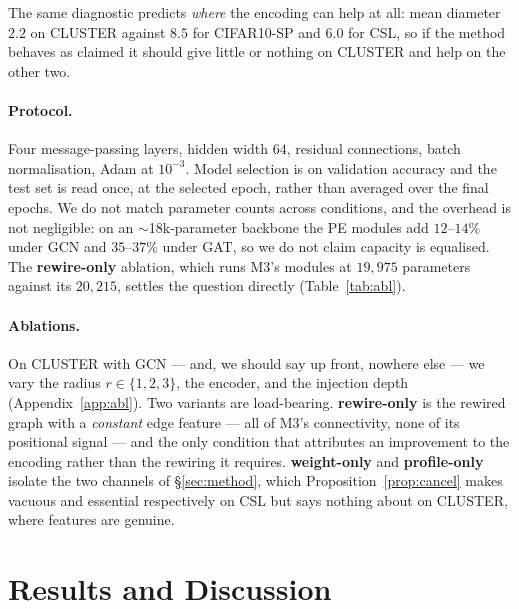 \documentclass[11pt]{article}
\begin{document}
The same diagnostic predicts \emph{where} the encoding can help at all: mean diameter $2.2$ on
CLUSTER against $8.5$ for CIFAR10-SP and $6.0$ for CSL, so if the method behaves as claimed it
should give little or nothing on CLUSTER and help on the other two.

\paragraph{Protocol.}
Four message-passing layers, hidden width $64$, residual connections, batch normalisation, Adam
at $10^{-3}$. Model selection is on validation accuracy and the test set is read once, at the
selected epoch, rather than averaged over the final epochs. We do not match parameter counts across conditions, and the overhead is
not negligible: on an $\sim$18k-parameter backbone the PE modules add $12$--$14\%$ under GCN and
$35$--$37\%$ under GAT, so we do not claim capacity is equalised. The \textbf{rewire-only}
ablation, which runs M3's modules at $19{,}975$ parameters against its $20{,}215$, settles the
question directly (Table~\ref{tab:abl}).

\paragraph{Ablations.}
On CLUSTER with GCN --- and, we should say up front, nowhere else --- we vary the radius
$r\in\{1,2,3\}$, the encoder, and the injection depth (Appendix~\ref{app:abl}). Two variants are
load-bearing. \textbf{rewire-only} is the rewired graph with a \emph{constant} edge feature ---
all of M3's connectivity, none of its positional signal --- and the only condition that attributes
an improvement to the encoding rather than the rewiring it requires.
\textbf{weight-only} and \textbf{profile-only} isolate the two channels of \S\ref{sec:method},
which Proposition~\ref{prop:cancel} makes vacuous and essential respectively on CSL but says
nothing about on CLUSTER, where features are genuine.

\section{Results and Discussion}

\begin{table}[t]
\centering\small

\caption{Test accuracy (\%), mean\,$\pm$\,std. CSL: 20 runs per cell (4 seeds $\times$ 5
stratified folds); CLUSTER: 3 seeds; CIFAR10-SP: a single run, so those cells carry no
variance estimate and none is printed.}
\label{tab:main}
\end{table}
\end{document}
